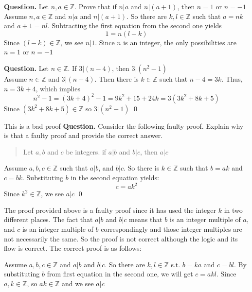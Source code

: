 \begin{example}{}
	\textbf{Question.} Let $ n,a \in \mathbb{Z} $. Prove that if $ n|a $ and $ n|(a+1) $, then $ n=1 $ or $ n=-1 $ \\
	
	 Assume $ n,a \in \mathbb{Z} $ and $ n|a $ and $ n|(a+1) $. So there are $ k,l \in \mathbb{Z} $ such that $ a=nk $ and $ a+1 = nl $. Subtracting the first equation from the second one yields
	\[ 1 = n(l-k) \]
	Since $ (l-k) \in \mathbb{Z} $, we see $ n|1 $. Since $ n $ is an integer, the only possibilities are $ n=1 $ or $ n=-1 $
\end{example}

\begin{example}{}
	\textbf{Question.} Let $ n \in \mathbb{Z} $. If $ 3|(n-4) $, then $ 3|(n^2-1) $ \\
	
	 Assume $ n \in \mathbb{Z} $ and $ 3|(n-4) $. Then there is $ k \in  \mathbb{Z} $ such that $ n-4 = 3k $. Thus, $ n=3k+4 $, which implies
	\[ n^2 - 1 = (3k+4)^2 - 1 = 9k^2 + 15 + 24k = 3 (3k^2 + 8k +5)  \]
	Since $ (3k^2 + 8k +5) \in \mathbb{Z} $ so $ 3|(n^2-1) $ \qed
\end{example}

\begin{example}{This is a bad proof}
	\textbf{Question.} Consider the following faulty proof. Explain why is that a faulty proof and provide the correct answer.
	\begin{quote}
		\centering
		Let $ a,b $ and $ c $ be integers. if $ a|b $ and $ b|c $, then $ a|c $ \\
	\end{quote}

	
	 Assume $ a,b,c \in \mathbb{Z} $ such that $ a|b $, and $ b|c $. So there is $ k \in \mathbb{Z} $ such that $ b=ak $ and $ c=bk $. Substituting $ b $ in the second equation yields:
	\[c  = ak^2\]
	Since $ k^2 \in \mathbb{Z} $, we see $ a|c $ \qed \newline
	
	 The proof provided above is a faulty proof since it has used the integer $ k $ in two different places. The fact that $ a|b $ and $ b|c $ means that $ b $ is an integer multiple of $ a $, and $ c $ is an integer multiple of $ b $ correspondingly and those integer multiples are not necessarily the same. So the proof is not correct although the logic and its flow is correct. The correct proof is as follows:
	
	 Assume $ a,b,c \in \mathbb{Z}$ and $ a|b $ and $ b|c $. So there are $ k,l \in \mathbb{Z} $ s.t. $ b=ka $ and $ c=bl $. By substituting $ b $ from first equation in the second one, we will get $ c=akl $. Since $ a,k \in \mathbb{Z} $, so $ ak \in \mathbb{Z} $ and we see $ a|c $
	
\end{example}

